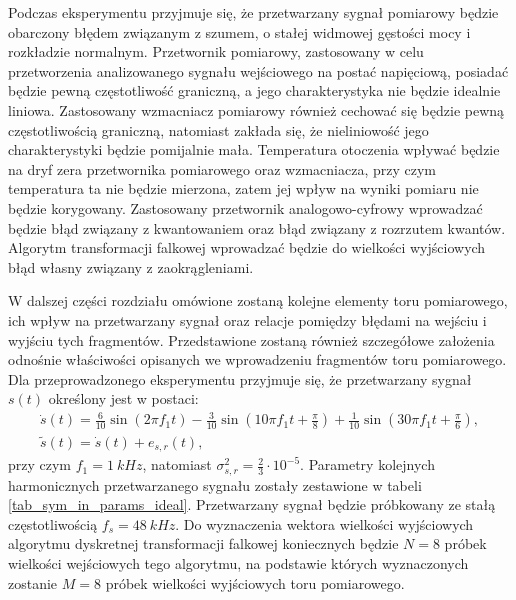 Podczas eksperymentu przyjmuje się, że przetwarzany sygnał pomiarowy będzie obarczony błędem związanym z szumem, o stałej widmowej gęstości mocy i rozkładzie normalnym. Przetwornik pomiarowy, zastosowany w celu przetworzenia analizowanego sygnału wejściowego na postać napięciową, posiadać będzie pewną częstotliwość graniczną, a jego charakterystyka nie będzie idealnie liniowa. Zastosowany wzmacniacz pomiarowy również cechować się będzie pewną częstotliwością graniczną, natomiast zakłada się, że nieliniowość jego charakterystyki będzie pomijalnie mała. Temperatura otoczenia wpływać będzie na dryf zera przetwornika pomiarowego oraz wzmacniacza, przy czym temperatura ta nie będzie mierzona, zatem jej wpływ na wyniki pomiaru nie będzie korygowany. Zastosowany przetwornik analogowo-cyfrowy wprowadzać będzie błąd związany z kwantowaniem oraz błąd związany z rozrzutem kwantów. Algorytm transformacji falkowej wprowadzać będzie do wielkości wyjściowych błąd własny związany z zaokrągleniami.

W dalszej części rozdziału omówione zostaną kolejne elementy toru pomiarowego, ich wpływ na przetwarzany sygnał oraz relacje pomiędzy błędami na wejściu i wyjściu tych fragmentów. Przedstawione zostaną również szczegółowe założenia odnośnie właściwości opisanych we wprowadzeniu fragmentów toru pomiarowego. Dla przeprowadzonego eksperymentu przyjmuje się, że przetwarzany sygnał $s(t)$ określony jest w postaci:
\begin{gather}
\dot{s}(t) = \frac{6}{10} \sin(2 \pi f_{1} t) - \frac{3}{10} \sin(10 \pi f_{1} t + \frac{\pi}{8}) + \frac{1}{10} \sin(30 \pi f_{1} t + \frac{\pi}{6}) \label{eqn_sym_in_ideal}, \\
\tilde{s}(t) = \dot{s}(t) + e_{s,r}(t) \label{eqn_sym_in_real},
\end{gather}
przy czym $f_{1} = \qty{1}{kHz}$, natomiast $\sigma_{s,r}^{2} = \frac{2}{3} \cdot 10^{-5}$. Parametry kolejnych harmonicznych przetwarzanego sygnału zostały zestawione w tabeli \ref{tab_sym_in_params_ideal}. Przetwarzany sygnał będzie próbkowany ze stałą częstotliwością $f_{s} = \qty{48}{kHz}$. Do wyznaczenia wektora wielkości wyjściowych algorytmu dyskretnej transformacji falkowej koniecznych będzie $N = 8$ próbek wielkości wejściowych tego algorytmu, na podstawie których wyznaczonych zostanie $M = 8$ próbek wielkości wyjściowych toru pomiarowego.

